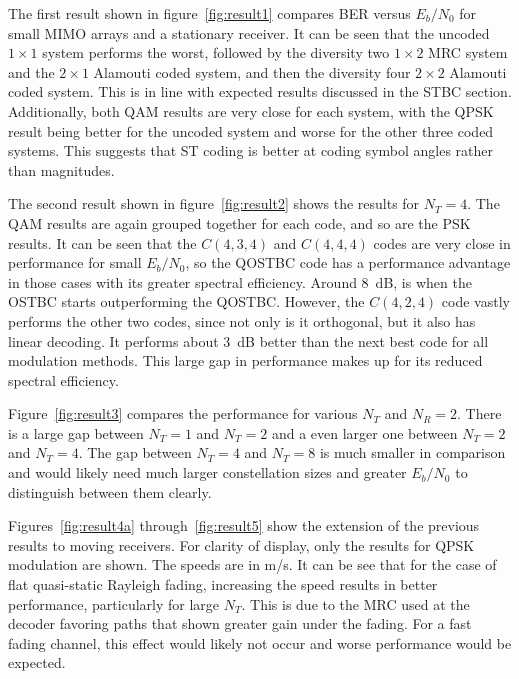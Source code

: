 

The first result shown in figure~\ref{fig:result1} compares BER versus $E_b/N_0$ for small MIMO arrays and a stationary receiver. It can be seen that the uncoded $1\times1$ system performs the worst, followed by the diversity two $1\times2$ MRC system and the $2\times1$ Alamouti coded system, and then the diversity four $2\times2$ Alamouti coded system. This is in line with expected results discussed in the STBC section. Additionally, both QAM results are very close for each system, with the QPSK result being better for the uncoded system and worse for the other three coded systems. This suggests that ST coding is better at coding symbol angles rather than magnitudes.

The second result shown in figure~\ref{fig:result2} shows the results for $N_T=4$. The QAM results are again grouped together for each code, and so are the PSK results. It can be seen that the $C(4,3,4)$ and $C(4,4,4)$ codes are very close in performance for small $E_b/N_0$, so the QOSTBC code has a performance advantage in those cases with its greater spectral efficiency. Around 8~dB, is when the OSTBC starts outperforming the QOSTBC. However, the $C(4,2,4)$ code vastly performs the other two codes, since not only is it orthogonal, but it also has linear decoding. It performs about 3~dB better than the next best code for all modulation methods. This large gap in performance makes up for its reduced spectral efficiency.

Figure~\ref{fig:result3} compares the performance for various $N_T$ and $N_R=2$. There is a large gap between $N_T=1$ and $N_T=2$ and a even larger one between $N_T=2$ and $N_T=4$. The gap between $N_T=4$ and $N_T=8$ is much smaller in comparison and would likely need much larger constellation sizes and greater $E_b/N_0$ to distinguish between them clearly.

Figures~\ref{fig:result4a} through~\ref{fig:result5} show the extension of the previous results to moving receivers. For clarity of display, only the results for QPSK modulation are shown. The speeds are in m/s. It can be see that for the case of flat quasi-static Rayleigh fading, increasing the speed results in better performance, particularly for large $N_T$. This is due to the MRC used at the decoder favoring paths that shown greater gain under the fading. For a fast fading channel, this effect would likely not occur and worse performance would be expected.

